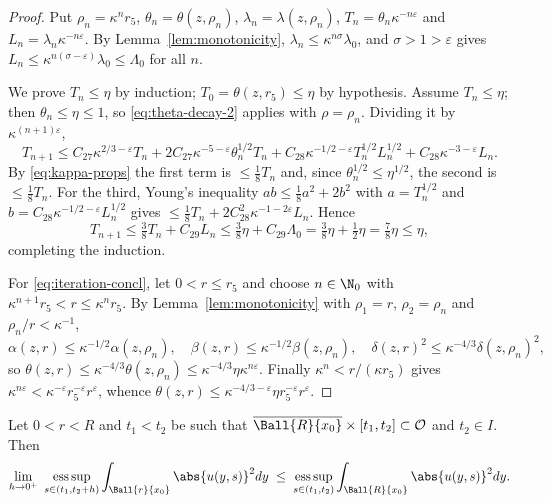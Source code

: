 \documentclass[11pt,reqno]{amsart}
\begin{document}
\begin{proof}
Put $\rho_{n}=\kappa^{n}r_{5}$, $\theta_{n}=\theta(z,\rho_{n})$,
$\lambda_{n}=\lambda(z,\rho_{n})$, $T_{n}=\theta_{n}\kappa^{-n\varepsilon}$ and
$L_{n}=\lambda_{n}\kappa^{-n\varepsilon}$. By Lemma~\ref{lem:monotonicity},
$\lambda_{n}\le\kappa^{n\sigma}\lambda_{0}$, and $\sigma>1>\varepsilon$ gives
$L_{n}\le\kappa^{n(\sigma-\varepsilon)}\lambda_{0}\le\Lambda_{0}$ for all $n$.

We prove $T_{n}\le\eta$ by induction; $T_{0}=\theta(z,r_{5})\le\eta$ by
hypothesis. Assume $T_{n}\le\eta$; then $\theta_{n}\le\eta\le1$, so
\eqref{eq:theta-decay-2} applies with $\rho=\rho_{n}$. Dividing it by
$\kappa^{(n+1)\varepsilon}$,
\[
  T_{n+1}\le C_{27}\kappa^{2/3-\varepsilon}T_{n}
   +2C_{27}\kappa^{-5-\varepsilon}\theta_{n}^{1/2}T_{n}
   +C_{28}\kappa^{-1/2-\varepsilon}T_{n}^{1/2}L_{n}^{1/2}
   +C_{28}\kappa^{-3-\varepsilon}L_{n}.
\]
By \eqref{eq:kappa-props} the first term is $\le\tfrac18T_{n}$ and, since
$\theta_{n}^{1/2}\le\eta^{1/2}$, the second is $\le\tfrac18T_{n}$. For the third,
Young's inequality $ab\le\tfrac18a^{2}+2b^{2}$ with $a=T_{n}^{1/2}$ and
$b=C_{28}\kappa^{-1/2-\varepsilon}L_{n}^{1/2}$ gives
$\le\tfrac18T_{n}+2C_{28}^{2}\kappa^{-1-2\varepsilon}L_{n}$. Hence
\[
  T_{n+1}\le\tfrac38T_{n}+C_{29}L_{n}
   \le\tfrac38\eta+C_{29}\Lambda_{0}=\tfrac38\eta+\tfrac12\eta=\tfrac78\eta\le\eta,
\]
completing the induction.

For \eqref{eq:iteration-concl}, let $0<r\le r_{5}$ and choose $n\in\N_{0}$ with
$\kappa^{n+1}r_{5}<r\le\kappa^{n}r_{5}$. By Lemma~\ref{lem:monotonicity} with
$\rho_{1}=r$, $\rho_{2}=\rho_{n}$ and $\rho_{n}/r<\kappa^{-1}$,
\[
  \alpha(z,r)\le\kappa^{-1/2}\alpha(z,\rho_{n}),\quad
  \beta(z,r)\le\kappa^{-1/2}\beta(z,\rho_{n}),\quad
  \delta(z,r)^{2}\le\kappa^{-4/3}\delta(z,\rho_{n})^{2},
\]
so $\theta(z,r)\le\kappa^{-4/3}\theta(z,\rho_{n})\le\kappa^{-4/3}\eta\kappa^{n\varepsilon}$.
Finally $\kappa^{n}<r/(\kappa r_{5})$ gives
$\kappa^{n\varepsilon}<\kappa^{-\varepsilon}r_{5}^{-\varepsilon}r^{\varepsilon}$,
whence $\theta(z,r)\le\kappa^{-4/3-\varepsilon}\eta r_{5}^{-\varepsilon}r^{\varepsilon}$.
\end{proof}

\begin{lemma}
\label{lem:alpha-usc}
Let $0<r<R$ and $t_{1}<t_{2}$ be such that
$\overline{\Ball{R}{x_{0}}}\times[t_{1},t_{2}]\subset\mathcal{O}$ and
$t_{2}\in I$. Then
\begin{equation}\label{eq:alpha-usc}
  \lim_{h\to0^{+}}\ \operatorname*{ess\,sup}_{s\in(t_{1},t_{2}+h)}
     \int_{\Ball{r}{x_{0}}}\abs{u(y,s)}^{2}dy
  \;\le\;\operatorname*{ess\,sup}_{s\in(t_{1},t_{2})}
     \int_{\Ball{R}{x_{0}}}\abs{u(y,s)}^{2}dy .
\end{equation}
\end{lemma}
\end{document}
